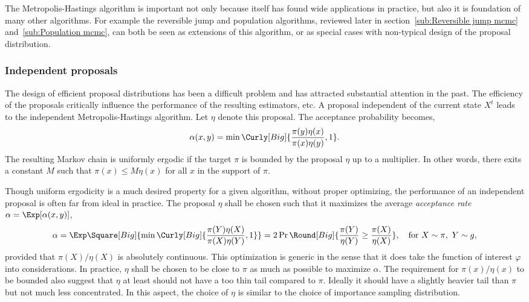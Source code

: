 The Metropolis-Hastings algorithm is important not only because itself has
found wide applications in practice, but also it is foundation of many other
algorithms. For example the reversible jump \mcmc and population \mcmc
algorithms, reviewed later in section~\ref{sub:Reversible jump mcmc}
and~\ref{sub:Population mcmc}, can both be seen as extensions of this
algorithm, or as special cases with non-typical design of the proposal
distribution.

\subsubsection{Independent proposals}
\label{ssub:Independent proposals}

The design of efficient proposal distributions has been a difficult problem
and has attracted substantial attention in the past. The efficiency of the
proposals critically influence the performance of the resulting estimators,
etc. A proposal independent of the current state $X^t$ leads to the
independent Metropolis-Hastings algorithm. Let $\eta$ denote this proposal.
The acceptance probability becomes,
\begin{equation}
  \alpha(x,y) = \min\Curly[Big]{\frac{\pi(y)\eta(x)}{\pi(x)\eta(y)},1}.
\end{equation}
The resulting Markov chain is uniformly ergodic if the target $\pi$ is bounded
by the proposal $\eta$ up to a multiplier. In other words, there exits a
constant $M$ such that $\pi(x)\le M\eta(x)$ for all $x$ in the support of
$\pi$.

Though uniform ergodicity is a much desired property for a given algorithm,
without proper optimizing, the performance of an independent proposal is often
far from ideal in practice. The proposal $\eta$ shall be chosen such that it
maximizes the average \emph{acceptance rate} $\alpha = \Exp[\alpha(x,y)]$,
\begin{equation}
  \alpha
  = \Exp\Square[Big]{\min\Curly[Big]{\frac{\pi(Y)\eta(X)}{\pi(X)\eta(Y)},1}}
  = 2\Pr\Round[Big]{\frac{\pi(Y)}{\eta(Y)}\ge\frac{\pi(X)}{\eta(X)}},\quad
  \text{for } X\sim\pi,\ Y\sim g,
\end{equation}
provided that $\pi(X)/\eta(X)$ is absolutely continuous. This optimization is
generic in the sense that it does take the function of interest $\varphi$ into
considerations. In practice, $\eta$ shall be chosen to be close to $\pi$ as
much as possible to maximize $\alpha$. The requirement for $\pi(x)/\eta(x)$ to
be bounded also suggest that $\eta$ at least should not have a too thin tail
compared to $\pi$. Ideally it should have a slightly heavier tail than $\pi$
but not much less concentrated. In this aspect, the choice of $\eta$ is
similar to the choice of importance sampling distribution.

